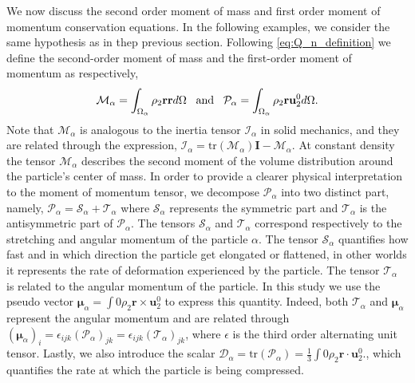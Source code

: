 We now discuss the second order moment of mass and first order moment of momentum conservation equations. 
In the following examples, we consider the same hypothesis as in thep previous section. 
Following \ref{eq:Q_n_definition} we define the second-order moment of mass and the first-order moment of momentum as respectively,
\begin{equation}
    \mathcal{M}_\alpha 
    = \int_{\Omega_\alpha}  \rho_2 \textbf{r} \textbf{r}  d\Omega
    \;\;\;\text{and}\;\;\;
    \mathcal{P}_\alpha 
    = \int_{\Omega_\alpha}  \rho_2 \textbf{r} \textbf{u}_2^0  d\Omega.
    \label{eq:first_moment_of_momentum_def}
\end{equation}
Note that $\mathcal{M}_\alpha$ is analogous to the inertia tensor $\mathcal{I}_\alpha$ in solid mechanics, and they are related through the expression, $\mathcal{I}_\alpha = \text{tr}(\mathcal{M}_\alpha)\textbf{I} - \mathcal{M}_\alpha$.
At constant density the tensor $\mathcal{M}_\alpha$ describes the second moment of the volume distribution around the particle's center of mass.
In order to provide a clearer physical interpretation to the moment of momentum tensor, we decompose $\mathcal{P}_\alpha$ into two distinct part, namely,
$\mathcal{P}_\alpha = \mathcal{S}_\alpha+\mathcal{T}_\alpha$ where $\mathcal{S}_\alpha$ represents the symmetric part and $\mathcal{T}_\alpha$ is the antisymmetric part of $\mathcal{P}_\alpha$.
The tensors $\mathcal{S}_\alpha$ and $\mathcal{T}_\alpha$ correspond respectively to the stretching and angular momentum of the particle $\alpha$. 
The tensor $\mathcal{S}_\alpha$ quantifies how fast and in which direction the particle get elongated or flattened, in other worlds it represents the rate of deformation experienced by the particle.
The tensor $\mathcal{T}_\alpha$ is related to the angular momentum of the particle. 
In this study we use the pseudo vector $\bm{\mu}_\alpha = \int0{ \rho_2 \textbf{r} \times \textbf{u}_2^0 }$ to express this quantity. 
Indeed, both  $\mathcal{T}_\alpha$ and $\bm{\mu}_\alpha$ represent the angular momentum and are related through $(\bm{\mu}_\alpha)_i = \epsilon_{ijk} (\mathcal{P}_\alpha)_{jk}= \epsilon_{ijk} (\mathcal{T}_\alpha)_{jk}$, where $\epsilon$ is the third order alternating unit tensor. 
Lastly, we also introduce the scalar $\mathcal{D}_\alpha = \text{tr}(\mathcal{P}_\alpha) = \frac{1}{3}\int0{ \rho_2 \textbf{r} \cdot \textbf{u}_2^0 }.$, which quantifies the rate at which the particle is being compressed.

